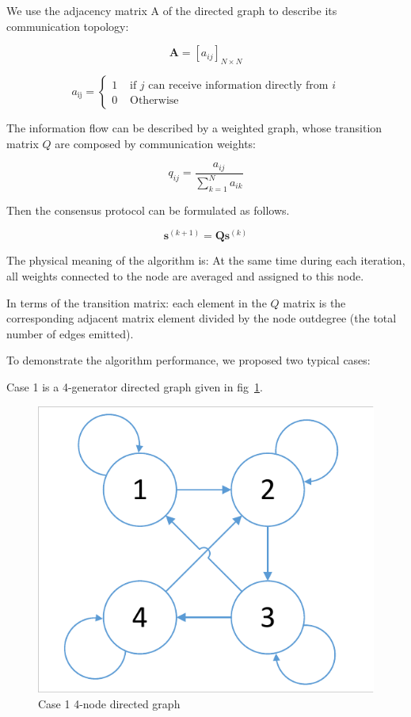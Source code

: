 \documentclass[conference]{IEEEtran}
\begin{document}
We use the adjacency matrix A of the directed graph to describe its communication topology:

\begin{equation}
    \mathbf{A}=\left[a_{i j}\right]_{N \times N}
\end{equation}

\begin{equation}
    a_{\mathrm{ij}}=\left\{\begin{array}{ll}
    {1} & {\text { if } j \text{ can receive information directly from } i } \\
    {0} & {\text { Otherwise }}
    \end{array}\right.
\end{equation}

The information flow can be described by a weighted graph, whose transition matrix $Q$ are composed by communication weights:

\begin{equation}
    q_{i j}=\frac{a_{i j}}{\sum_{k=1}^{N} a_{i k}}
\end{equation}

Then the consensus protocol can be formulated as follows.

\begin{equation}\boldsymbol{s}^{(k+1)}=\boldsymbol{Q} \boldsymbol{s}^{(k)}\end{equation}

The physical meaning of the algorithm is: At the same time during each iteration, all weights connected to the node are averaged and assigned to this node.

In terms of the transition matrix: each element in the $Q$ matrix is the corresponding adjacent matrix element divided by the node outdegree (the total number of edges emitted).

To demonstrate the algorithm performance, we proposed two typical cases:

Case 1 is a 4-generator directed graph given in fig~\ref{fig:Directed-graph}.

\begin{figure}[htbp] %
    \centering
    \includegraphics[width=0.6\columnwidth]{Directed-graph.pdf}
    \caption{Case 1 4-node directed graph}
    \label{fig:Directed-graph}
\end{figure}
\end{document}
